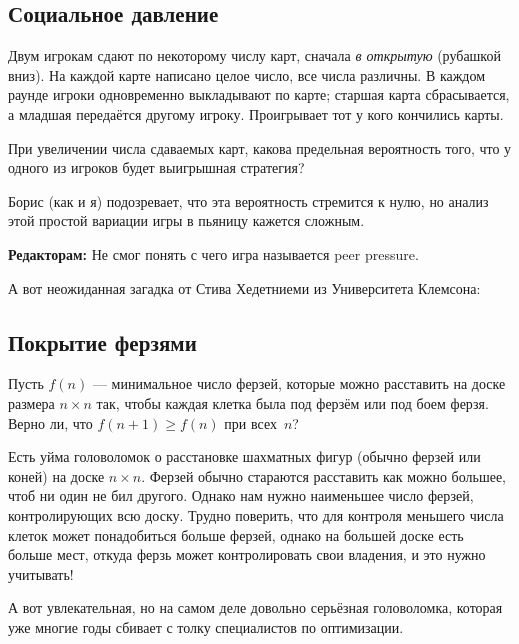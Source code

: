 \subsection*{Социальное давление}

Двум игрокам сдают по некоторому числу карт, сначала \emph{в открытую} (рубашкой вниз).
На каждой карте написано целое число, все числа различны.
В каждом раунде игроки одновременно выкладывают по карте;
старшая карта сбрасывается, а младшая передаётся другому игроку.
Проигрывает тот у кого кончились карты.

При увеличении числа сдаваемых карт,
какова предельная вероятность того, что у одного из игроков будет выигрышная стратегия?

\medskip

Борис (как и я) подозревает, что эта вероятность стремится к нулю, но анализ этой простой вариации игры в пьяницу кажется сложным.

\begin{addedbytheeditors}
\textbf{Редакторам:} Не смог понять с чего игра называется peer pressure.
\end{addedbytheeditors}

\medskip

А вот неожиданная загадка от Стива Хедетниеми из Университета Клемсона:

\subsection*{Покрытие ферзями}

Пусть $f(n)$ --- минимальное число ферзей, которые можно расставить на доске размера $n \times n$ так, чтобы каждая клетка была под ферзём или под боем ферзя.
Верно ли, что $f(n + 1) \geqslant f(n)$ при всех~$n$?

\medskip

Есть уйма головоломок о расстановке шахматных фигур (обычно ферзей или коней) на доске $n \times n$.
Ферзей обычно стараются расставить как можно большее, чтоб ни один не бил другого.
Однако нам нужно наименьшее число ферзей, контролирующих всю доску.
Трудно поверить, что для контроля меньшего числа клеток может понадобиться больше ферзей, однако на большей доске есть больше мест, откуда ферзь может контролировать свои владения, и это нужно учитывать!

\medskip

А вот увлекательная, но на самом деле довольно серьёзная головоломка, которая уже многие годы сбивает с толку специалистов по оптимизации.

